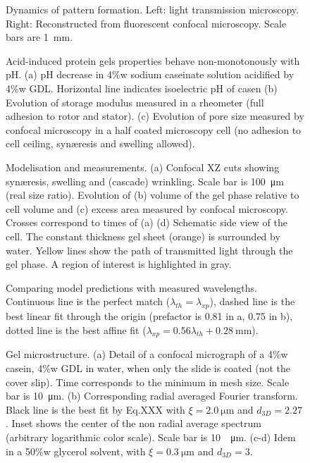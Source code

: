 \documentclass[twocolumn,superscriptaddress,showpacs,preprintnumbers,amsmath,amssymb,prl]{revtex4-1}
\begin{document}
\author{Mathieu Leocmach}

\begin{figure}
	
	\caption{Dynamics of pattern formation. Left: light transmission microscopy. Right: Reconstructed from fluorescent confocal microscopy. Scale bars are \SI{1}{\milli\metre}.}
	\label{fig:dynamics}
\end{figure}

\begin{figure}
	
	\caption{Acid-induced protein gels properties behave non-monotonously with pH. (a) pH decrease in 4\%w sodium caseinate solution acidified by 4\%w GDL. Horizontal line indicates isoelectric pH of casen (b) Evolution of storage modulus measured in a rheometer (full adhesion to rotor and stator). (c) Evolution of pore size measured by confocal microscopy in a half coated microscopy cell (no adhesion to cell ceiling, syn\ae{}resis and swelling allowed).}
	\label{fig:acidification}
\end{figure}

\begin{figure}
	
	\caption{Modelisation  and measurements. (a) Confocal XZ cuts showing syn\ae{}resis, swelling and (cascade) wrinkling. Scale bar is \SI{100}{\micro\metre} (real size ratio). Evolution of (b) volume of the gel phase relative to cell volume and (c) excess area measured by confocal microscopy. Crosses correspond to times of (a) (d) Schematic side view of the cell. The constant thickness gel sheet (orange) is surrounded by water. Yellow lines show the path of transmitted light through the gel phase. A region of interest is highlighted in gray.}
	\label{fig:sideview}
\end{figure}

\begin{figure*}
	
	\caption{Comparing model predictions with measured wavelengths. Continuous line is the perfect match ($\lambda_{th}=\lambda_{xp}$), dashed line is the best linear fit through the origin (prefactor is 0.81 in a, 0.75 in b), dotted line is the best affine fit ($\lambda_{xp}=0.56\lambda_{th}+\SI{0.28}{\milli\metre}$).}
	\label{fig:DarcyPoiseuille}
\end{figure*}

\begin{figure}
	
	\caption{Gel microstructure. (a) Detail of a confocal micrograph of a 4\%w casein, 4\%w GDL in water, when only the slide is coated (not the cover slip). Time corresponds to the minimum in mesh size. Scale bar is \SI{10}{\micro\metre}. (b) Corresponding radial averaged Fourier transform. Black line is the best fit by Eq.XXX with $\xi=\SI{2.0}{\micro\metre}$ and $d_{3D}=2.27$. Inset shows the center of the non radial average spectrum (arbitrary logarithmic color scale). Scale bar is \SI{10}{\per\micro\metre}. (c-d) Idem in a 50\%w glycerol solvent, with $\xi=\SI{0.3}{\micro\metre}$ and $d_{3D}=3$.}
	\label{fig:mesh}
\end{figure}
\end{document}
